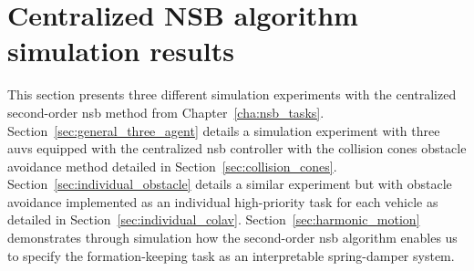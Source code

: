 \section{Centralized NSB algorithm simulation results}\label{sec:centralized_simulations}
This section presents three different simulation experiments with the centralized second-order \gls{nsb} method from Chapter~\ref{cha:nsb_tasks}. Section~\ref{sec:general_three_agent} details a simulation experiment with three \glspl{auv} equipped with the centralized \gls{nsb} controller with the collision cones obstacle avoidance method detailed in Section~\ref{sec:collision_cones}. Section~\ref{sec:individual_obstacle} details a similar experiment but with obstacle avoidance implemented as an individual high-priority task for each vehicle as detailed in Section~\ref{sec:individual_colav}. Section~\ref{sec:harmonic_motion} demonstrates through simulation how the second-order \gls{nsb} algorithm enables us to specify the formation-keeping task as an interpretable spring-damper system. 



